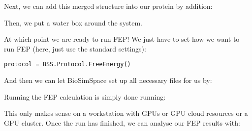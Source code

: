 Next, we can add this merged structure into our protein by addition:

\begin{Shaded}
\begin{Highlighting}[]
\OperatorTok{=}\OperatorTok{+}
\end{Highlighting}
\end{Shaded}

Then, we put a water box around the system.

\begin{Shaded}
\begin{Highlighting}[]
\OperatorTok{=}\OperatorTok{=}\OperatorTok{=}\OperatorTok{*}\NormalTok{[}\OperatorTok{*}\NormalTok{BSS.Units.Length.nanometer])}
\end{Highlighting}
\end{Shaded}

At which point we are ready to run FEP! We just have to set how we want
to run FEP (here, just use the standard settings):

\begin{verbatim}
protocol = BSS.Protocol.FreeEnergy()
\end{verbatim}

And then we can let BioSimSpace set up all necessary files for us by:

\begin{Shaded}
\begin{Highlighting}[]
\OperatorTok{=}\OperatorTok{=}\NormalTok{)}
\end{Highlighting}
\end{Shaded}

Running the FEP calculation is simply done running:

\begin{Shaded}
\begin{Highlighting}[]
\end{Highlighting}
\end{Shaded}

This only makes sense on a workstation with GPUs or GPU cloud resources
or a GPU cluster. Once the run has finished, we can analyse our FEP
results with:

\begin{Shaded}
\begin{Highlighting}[]
\end{Highlighting}
\end{Shaded}


